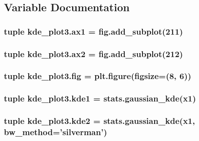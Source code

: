 \subsection{Variable Documentation}
\hypertarget{namespacekde__plot3_ab0d9f7bca54981c3c97090060dba30f5}{}
\subsubsection[{ax1}]{\setlength{\rightskip}{0pt plus 5cm}tuple kde\+\_\+plot3.\+ax1 = fig.\+add\+\_\+subplot(211)}\label{namespacekde__plot3_ab0d9f7bca54981c3c97090060dba30f5}
\hypertarget{namespacekde__plot3_af46ce103d8b1f2d25d0ac0244a485328}{}
\subsubsection[{ax2}]{\setlength{\rightskip}{0pt plus 5cm}tuple kde\+\_\+plot3.\+ax2 = fig.\+add\+\_\+subplot(212)}\label{namespacekde__plot3_af46ce103d8b1f2d25d0ac0244a485328}
\hypertarget{namespacekde__plot3_ad3eed5c2e7bd3871301ec48833564243}{}
\subsubsection[{fig}]{\setlength{\rightskip}{0pt plus 5cm}tuple kde\+\_\+plot3.\+fig = plt.\+figure(figsize=(8, 6))}\label{namespacekde__plot3_ad3eed5c2e7bd3871301ec48833564243}
\hypertarget{namespacekde__plot3_aaa233999b8dcc57c0fd06941b4f8df28}{}
\subsubsection[{kde1}]{\setlength{\rightskip}{0pt plus 5cm}tuple kde\+\_\+plot3.\+kde1 = stats.\+gaussian\+\_\+kde({\bf x1})}\label{namespacekde__plot3_aaa233999b8dcc57c0fd06941b4f8df28}
\hypertarget{namespacekde__plot3_affd6aafd4a735d04fcd04d2687b1e5d0}{}
\subsubsection[{kde2}]{\setlength{\rightskip}{0pt plus 5cm}tuple kde\+\_\+plot3.\+kde2 = stats.\+gaussian\+\_\+kde({\bf x1}, bw\+\_\+method='silverman')}\label{namespacekde__plot3_affd6aafd4a735d04fcd04d2687b1e5d0}
\hypertarget{namespacekde__plot3_a6dcf138f4a61bb8402a2533abea1de40}{}
